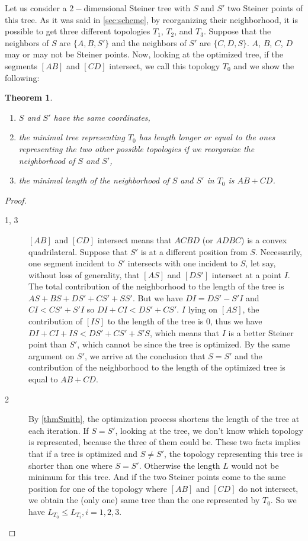 \documentclass{article}
\theoremstyle{plain}
\newtheorem{theorem}{Theorem}[section]
\begin{document}
Let us consider a $2-$dimensional Steiner tree with $S$ and $S'$ two Steiner points of this tree. 
As it was said in \cref{sec:scheme}, by reorganizing their neighborhood, it is possible to get three different topologies $T_1$, $T_2$, and $T_3$. 
Suppose that the neighbors of $S$ are $\{A,B,S'\}$ and the neighbors of $S'$ are $\{C,D,S\}$. 
$A$, $B$, $C$, $D$ may or may not be Steiner points. 
Now, looking at the optimized tree,  if the segments $[AB]$ and $[CD]$ intersect, we call this topology $T_0$ and we show the following:
\begin{theorem}\mbox{ }
\begin{enumerate}
\item{$S$ and $S'$ have the same coordinates,}
\item{the minimal tree representing $T_0$ has length longer or equal to the ones representing the two other possible topologies if we reorganize the neighborhood of $S$ and $S'$,}
\item{the minimal length of the neighborhood of $S$ and $S'$ in $T_0$ is $AB + CD$.}
\end{enumerate}
\end{theorem}
\begin{proof}\mbox{ }
\begin{description}
\item[1, 3]$[AB]$ and $[CD]$ intersect means that $ACBD$ (or $ADBC$) is a convex quadrilateral. 
Suppose that $S'$ is at a different position from $S$. 
Necessarily, one segment incident to $S'$ intersects with one incident to $S$, let say, without loss of generality, that $[AS]$ and $[DS']$ intersect at a point $I$. 
The total contribution of the neighborhood to the length of the tree is $AS + BS + DS' + CS' + SS'$. 
But we have $DI = DS' - S'I$ and $CI < CS' + S'I$ so $DI + CI < DS' + CS'$. 
$I$ lying on $[AS]$, the contribution of $[IS]$ to the length of the tree is $0$, thus we have $DI + CI + IS < DS' + CS' + S'S$, which means that $I$ is a better Steiner point than $S'$, which cannot be since the tree is optimized. 
By the same argument on $S'$, we arrive at the conclusion that $S=S'$ and the contribution of the neighborhood to the length of the optimized tree is equal to $AB + CD$.
\item[2]By \cref{thmSmith}, the optimization process shortens the length of the tree at each iteration. If $S=S'$, looking at the tree, we don't know which topology is represented, because the three of them could be. 
These two facts implies that if a tree is optimized and $S\neq S'$, the topology representing this tree is shorter than one where $S=S'$. 
Otherwise the length $L$ would not be minimum for this tree. 
And if the two Steiner points come to the same position for one of the topology where $[AB]$ and $[CD]$ do not intersect, we obtain the (only one) same tree than the one represented by $T_0$. 
So we have $L_{T_0} \leq L_{T_i}, i=1,2,3.$   
\end{description}
\end{proof}
\end{document}
